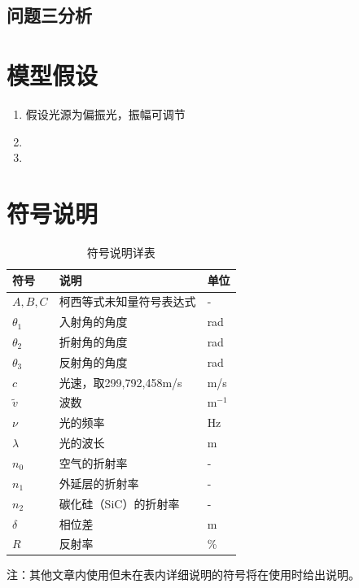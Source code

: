 \documentclass[withoutpreface,bwprint]{cumcmthesis} %
\begin{document}
\subsection{问题三分析}

\section{模型假设}

\begin{enumerate}
    \item 假设光源为偏振光，振幅可调节
    \item 
    \item 
\end{enumerate}

\section{符号说明}

\begin{table}[H]
    \centering  %
    \caption{符号说明详表}  %
    \label{tab:符号说明}  %
    \begin{threeparttable}
        \begin{tabularx}{\textwidth}{p{} p{} l}
            \toprule[1.5pt]
            \textbf{符号} & \textbf{说明} & \textbf{单位} \\ 
            \midrule[1pt]
            $A, B, C$ & 柯西等式未知量符号表达式 & - \\
            $\theta_1$ & 入射角的角度 & rad \\
            $\theta_2$ & 折射角的角度 & rad \\
            $\theta_3$ & 反射角的角度 & rad \\
            $c$ & 光速，取299,792,458m/s & m/s \\
            $\tilde{v} $ & 波数 & m$^{-1}$\\
            $\nu$ & 光的频率 & Hz\\
            $\lambda$ & 光的波长 & m\\
            $n_0$ & 空气的折射率 & - \\
            $n_1$ & 外延层的折射率 & - \\
            $n_2$ & 碳化硅（SiC）的折射率 & - \\
            $\delta$ & 相位差 & m \\
            $R$ & 反射率 & \% \\  

            \bottomrule[1.5pt]
        
        \end{tabularx}
        \begin{tablenotes}
            \footnotesize
            \item 注：其他文章内使用但未在表内详细说明的符号将在使用时给出说明。
        \end{tablenotes}
    \end{threeparttable}
\end{table}
\end{document}
